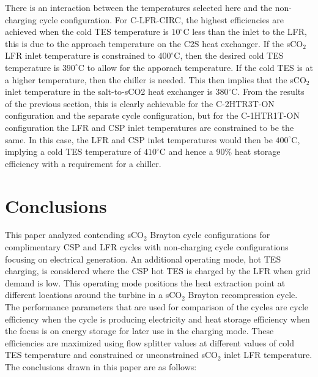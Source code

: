 \begin{paracol}{2}
There is an interaction between the temperatures selected here and the non-charging cycle configuration. For C-LFR-CIRC, the highest efficiencies are achieved when the cold TES temperature is $10^{\circ}$C less than the inlet to the LFR, this is due to the approach temperature on the C2S heat exchanger. If the sCO$_2$ LFR inlet temperature is constrained to $400^{\circ}$C, then the desired cold TES temperature is $390^{\circ}$C to allow for the apporach temperature. If the cold TES is at a higher temperature, then the chiller is needed. This then implies that the sCO$_2$ inlet temperature in the salt-to-sCO2 heat exchanger is  $380^{\circ}$C. From the results of the previous section, this is clearly achievable for the C-2HTR3T-ON configuration and the separate cycle configuration, but for the C-1HTR1T-ON configuration the LFR and CSP inlet temperatures are constrained to be the same. In this case, the LFR and CSP inlet temperatures would then be $400^{\circ}$C, implying a cold TES temperature of  $410^{\circ}$C and hence a 90\% heat storage efficiency with a requirement for a chiller.


\section{Conclusions}

This paper analyzed contending sCO$_2$ Brayton cycle configurations for complimentary CSP and LFR cycles with non-charging cycle configurations focusing on electrical generation. An additional operating mode, hot TES charging, is considered where the CSP hot TES is charged by the LFR when grid demand is low. This operating mode positions the heat extraction point at different locations around the turbine in a sCO$_2$ Brayton recompression cycle. The performance parameters that are used for comparison of the cycles are cycle efficiency when the cycle is producing electricity and heat storage efficiency when the focus is on energy storage for later use in the charging mode. These efficiencies are maximized using flow splitter values at different values of cold TES temperature and constrained or unconstrained sCO$_2$ inlet LFR temperature. The conclusions drawn in this paper are as follows:


\end{paracol}
